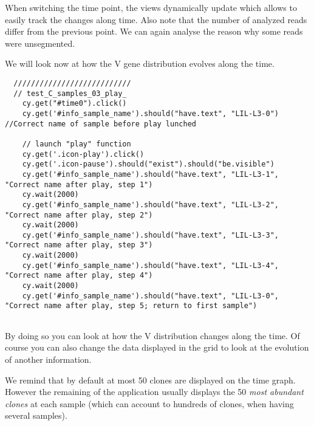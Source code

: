 When switching the time point, the views dynamically update which allows to
easily track the changes along time. Also note that the number of analyzed
reads differ from the previous point. We can again analyse the reason why some
reads were unsegmented.


\bigskip

We will look now at how the V gene distribution evolves along the time.
\begin{verbatim}
  ///////////////////////////
  // test_C_samples_03_play_
    cy.get("#time0").click()
    cy.get('#info_sample_name').should("have.text", "LIL-L3-0") //Correct name of sample before play lunched

    // launch "play" function
    cy.get('.icon-play').click()
    cy.get('.icon-pause').should("exist").should("be.visible")
    cy.get('#info_sample_name').should("have.text", "LIL-L3-1", "Correct name after play, step 1")
    cy.wait(2000)
    cy.get('#info_sample_name').should("have.text", "LIL-L3-2", "Correct name after play, step 2")
    cy.wait(2000)
    cy.get('#info_sample_name').should("have.text", "LIL-L3-3", "Correct name after play, step 3")
    cy.wait(2000)
    cy.get('#info_sample_name').should("have.text", "LIL-L3-4", "Correct name after play, step 4")
    cy.wait(2000)
    cy.get('#info_sample_name').should("have.text", "LIL-L3-0", "Correct name after play, step 5; return to first sample")


\end{verbatim}

By doing so you can look at how the V distribution changes along the time.
Of course you can also change the data displayed in the grid to look at
the evolution of another information.

\bigskip

We remind that by default at most 50 clones are displayed
on the time graph. However the remaining of the application usually displays
the 50 \textit{most abundant clones} at each sample (which can account to hundreds of
clones, when having several samples).

